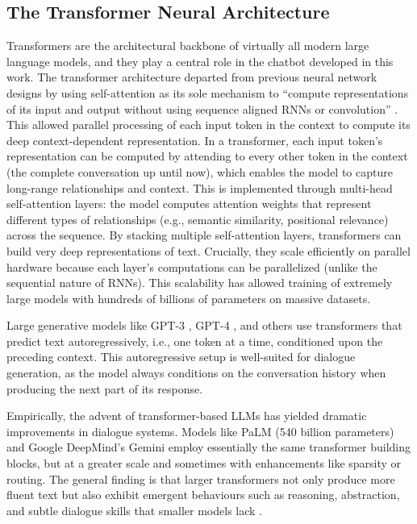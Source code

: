 \subsection*{The Transformer Neural Architecture}
\label{ssec:transformers}
Transformers are the architectural backbone of virtually all modern large language models, and they play a central role in the chatbot developed in this work. The transformer architecture \cite{vaswani2017attention} departed from previous neural network designs by using self-attention as its sole mechanism to ``compute representations of its input and output without using sequence aligned RNNs or convolution'' \cite{vaswani2017attention}. This allowed parallel processing of each input token in the context to compute its deep context-dependent representation. In a transformer, each input token's representation can be computed by attending to every other token in the context (the complete conversation up until now), which enables the model to capture long-range relationships and context. This is implemented through multi-head self-attention layers: the model computes attention weights that represent different types of relationships (e.g., semantic similarity, positional relevance) across the sequence. By stacking multiple self-attention layers, transformers can build very deep representations of text. Crucially, they scale efficiently on parallel hardware because each layer's computations can be parallelized (unlike the sequential nature of RNNs). This scalability has allowed training of extremely large models with hundreds of billions of parameters on massive datasets.

Large generative models like GPT-3 \cite{brown2020language}, GPT-4
\cite{openai2023gpt4}, and others use transformers that predict text autoregressively,
i.e., one token at a time, conditioned upon the preceding context. This autoregressive
setup is well-suited for dialogue generation, as the model always conditions on the
conversation history when producing the next part of its response.

Empirically, the advent of transformer-based LLMs has yielded dramatic improvements in
dialogue systems. Models like PaLM \cite{chowdhery2022palm} (540 billion parameters)
and Google DeepMind's Gemini \cite{geminiteam2025geminifamilyhighlycapable} employ
essentially the same transformer building blocks, but at a greater scale and sometimes
with enhancements like sparsity or routing. The general finding is that larger
transformers not only produce more fluent text but also exhibit emergent behaviours
such as reasoning, abstraction, and subtle dialogue skills that smaller models lack
\cite{52065,berti2025emergentabilitieslargelanguage}.

